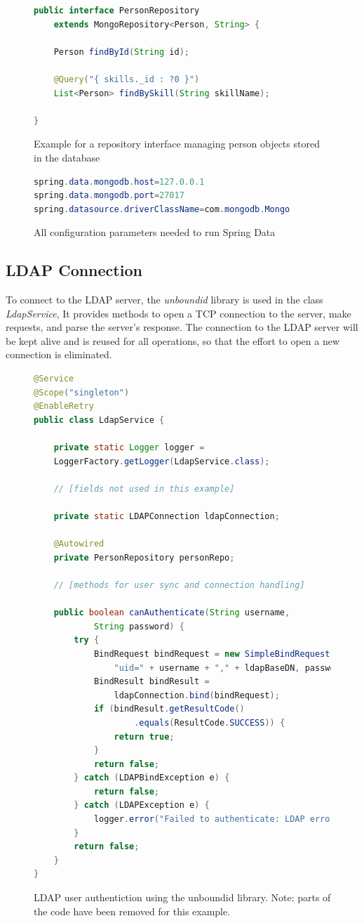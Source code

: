 \begin{figure}[h]
\begin{lstlisting}[language=Java]
public interface PersonRepository
    extends MongoRepository<Person, String> {

	Person findById(String id);

	@Query("{ skills._id : ?0 }")
	List<Person> findBySkill(String skillName);

}
\end{lstlisting}
\caption[Example Repository Interface]{Example for a repository interface managing person objects stored in the database}
\end{figure}

\begin{figure}[h]
\begin{lstlisting}[language=Java]
spring.data.mongodb.host=127.0.0.1
spring.data.mongodb.port=27017
spring.datasource.driverClassName=com.mongodb.Mongo
\end{lstlisting}
\caption[Spring Data Config]{All configuration parameters needed to run Spring Data}
\end{figure}

\subsection{LDAP Connection}
To connect to the LDAP server, the \textit{unboundid} library is used in the class \textit{LdapService}, It provides methods to open a TCP connection to the server, make requests, and parse the server's response. The connection to the LDAP server will be kept alive and is reused for all operations, so that the effort to open a new connection is eliminated.

\begin{figure}[H]
\begin{lstlisting}[language=Java]
@Service
@Scope("singleton")
@EnableRetry
public class LdapService {

	private static Logger logger =
    LoggerFactory.getLogger(LdapService.class);

	// [fields not used in this example]

	private static LDAPConnection ldapConnection;

	@Autowired
	private PersonRepository personRepo;

	// [methods for user sync and connection handling]

	public boolean canAuthenticate(String username,
			String password) {
		try {
			BindRequest bindRequest = new SimpleBindRequest(
				"uid=" + username + "," + ldapBaseDN, password);
			BindResult bindResult =
				ldapConnection.bind(bindRequest);
			if (bindResult.getResultCode()
					.equals(ResultCode.SUCCESS)) {
				return true;
			}
			return false;
		} catch (LDAPBindException e) {
			return false;
		} catch (LDAPException e) {
			logger.error("Failed to authenticate: LDAP error");
		}
		return false;
	}
}
\end{lstlisting}
\caption[LDAP User Authentication (Code)]{LDAP user authentiction using the unboundid library. Note: parts of the code have been removed for this example.}
\end{figure}


